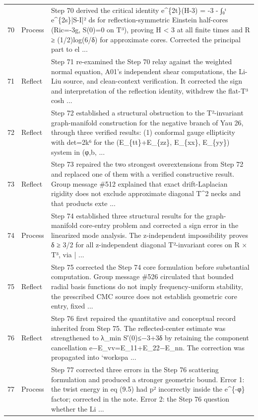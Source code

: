 \documentclass[UTF8,fontset=fandol,zihao=-4]{ctexart}
\begin{document}
\begin{longtable}{r p{} >{\raggedright\arraybackslash}p{}}
70 & Process & Step 70 derived the critical identity e\textasciicircum{}\{2t\}(H-3) = -3 - ∫₀ᵗ e\textasciicircum{}\{2s\}|S-I|² ds for reflection-symmetric Einstein half-cores (Ric=-3g, S(0)=0 on T³), proving H < 3 at all finite times and R ≥ (1/2)log(6/δ) for approximate cores. Corrected the principal part to el ...\\
71 & Reflect & Step 71 re-examined the Step 70 relay against the weighted normal equation, A01's independent shear computations, the Li-Liu source, and clean-context verification. It corrected the sign and interpretation of the reflection identity, withdrew the flat-T³ cosh  ...\\
72 & Reflect & Step 72 established a structural obstruction to the T²-invariant graph-manifold construction for the negative branch of Yau 26, through three verified results: (1) conformal gauge ellipticity with det=2k⁶ for the (E\_\{tt\}+E\_\{zz\}, E\_\{xx\}, E\_\{yy\}) system in (φ,b, ...\\
73 & Reflect & Step 73 repaired the two strongest overextensions from Step 72 and replaced one of them with a verified constructive result. Group message \#512 explained that exact drift-Laplacian rigidity does not exclude approximate diagonal T\textasciicircum{}2 necks and that products exte ...\\
74 & Process & Step 74 established three structural results for the graph-manifold core-entry problem and corrected a sign error in the linearized mode analysis. The z-independent impossibility proves δ ≥ 3/2 for all z-independent diagonal T²-invariant cores on R × T³, via | ...\\
75 & Reflect & Step 75 corrected the Step 74 core formulation before substantial computation. Group message \#526 circulated that bounded radial basis functions do not imply frequency-uniform stability, the prescribed CMC source does not establish geometric core entry, fixed  ...\\
76 & Reflect & Step 76 first repaired the quantitative and conceptual record inherited from Step 75. The reflected-center estimate was strengthened to λ\_min S′(0)≤−3+3δ by retaining the component cancellation e−E\_vv=E\_11+E\_22−E\_nn. The correction was propagated into `workspa ...\\
77 & Process & Step 77 corrected three errors in the Step 76 scattering formulation and produced a stronger geometric bound. Error 1: the twist energy in eq (9.5) had p² incorrectly inside the e\textasciicircum{}\{-φ\} factor; corrected in the note. Error 2: the Step 76 question whether the Li ...\\

\end{longtable}
\end{document}
